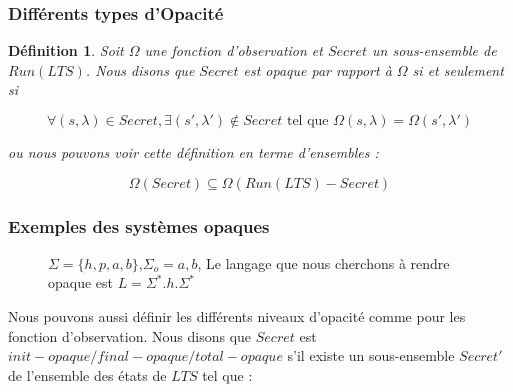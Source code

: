 \documentclass[10pt,a4paper]{article}
\newtheorem {mydef} {D\'efinition}
\begin{document}
	
\subsubsection{Diff\'erents types d'Opacit\'e}

\begin{mydef}
	Soit $\Omega$ une fonction d'observation et $Secret$ un sous-ensemble de $Run(LTS)$. Nous disons que $Secret$ est opaque par rapport \`a $\Omega$ si et seulement si
	
	$$\forall (s,\lambda) \in Secret, \exists (s',\lambda')\not\in Secret \mbox{ tel que } \Omega(s,\lambda) = \Omega (s',\lambda')$$
	
	ou nous pouvons voir cette d\'efinition en terme d'ensembles :
	
	$$\Omega(Secret)\subseteq \Omega(Run(LTS)-Secret)$$
\end{mydef}

\subsubsection{Exemples des syst\`emes opaques}
		\begin{figure}[H]
                \centering
                \caption{$\Sigma = \{h,p,a,b\}$,$\Sigma_o = {a,b}$, Le langage que nous cherchons \`a rendre opaque est $L = \Sigma^*.h.\Sigma^*$}
		\end{figure}		
		
Nous pouvons aussi d\'efinir les diff\'erents niveaux d'opacit\'e comme pour les fonction d'observation. Nous disons que $Secret$ est $init-opaque/final-opaque/total-opaque$ s'il existe un sous-ensemble  $Secret'$ de l'ensemble des \'etats de $LTS$ tel que :
\end{document}
